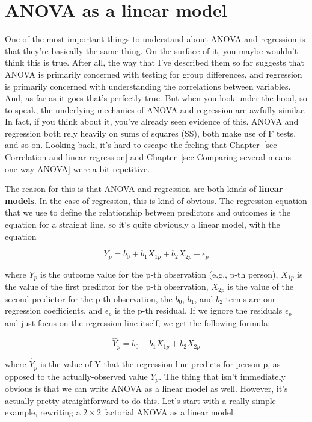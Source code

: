 \documentclass[
  a4paper,
]{book}
\begin{document}
\hypertarget{sec-ANOVA-as-a-linear-model}{%
\section{ANOVA as a linear model}\label{sec-ANOVA-as-a-linear-model}}

One of the most important things to understand about ANOVA and
regression is that they're basically the same thing. On the surface of
it, you maybe wouldn't think this is true. After all, the way that I've
described them so far suggests that ANOVA is primarily concerned with
testing for group differences, and regression is primarily concerned
with understanding the correlations between variables. And, as far as it
goes that's perfectly true. But when you look under the hood, so to
speak, the underlying mechanics of ANOVA and regression are awfully
similar. In fact, if you think about it, you've already seen evidence of
this. ANOVA and regression both rely heavily on sums of squares (SS),
both make use of F tests, and so on. Looking back, it's hard to escape
the feeling that Chapter~\ref{sec-Correlation-and-linear-regression} and
Chapter~\ref{sec-Comparing-several-means-one-way-ANOVA} were a bit
repetitive.

The reason for this is that ANOVA and regression are both kinds of
\textbf{linear models}. In the case of regression, this is kind of
obvious. The regression equation that we use to define the relationship
between predictors and outcomes is the equation for a straight line, so
it's quite obviously a linear model, with the equation

\[Y_p=b_0+b_1 X_{1p} +b_2 X_{2p} + \epsilon_p\]

where \(Y_p\) is the outcome value for the p-th observation (e.g., p-th
person), \(X_{1p}\) is the value of the first predictor for the p-th
observation, \(X_{2p}\) is the value of the second predictor for the
p-th observation, the \(b_0\), \(b_1\), and \(b_2\) terms are our
regression coefficients, and \(\epsilon_p\) is the p-th residual. If we
ignore the residuals \(\epsilon_p\) and just focus on the regression
line itself, we get the following formula:

\[\hat{Y}_p=b_0+b_1 X_{1p} +b_2 X_{2p} \]

where \(\hat{Y}_p\) is the value of Y that the regression line predicts
for person p, as opposed to the actually-observed value \(Y_p\). The
thing that isn't immediately obvious is that we can write ANOVA as a
linear model as well. However, it's actually pretty straightforward to
do this. Let's start with a really simple example, rewriting a
\(2 \times 2\) factorial ANOVA as a linear model.
\end{document}
